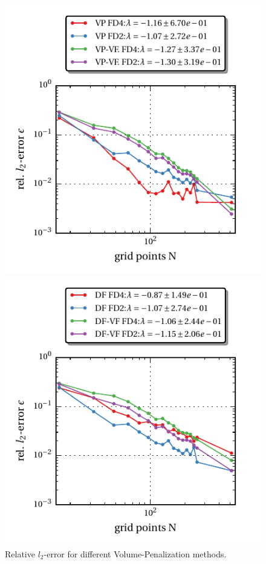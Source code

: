 \clearpage
\begin{figure}[!bp]
  \begin{minipage}[c]{0.5\textwidth}
      \includegraphics{gfx/immersed_boundary/tcflow/theo/vp.pdf}
      \caption{Relative $l_2$-error for different Volume-Penalization methods.}
      \label{vali:tc_flow_gc_vp}
  \end{minipage}
  \begin{minipage}[c]{0.5\textwidth}
      \includegraphics{gfx/immersed_boundary/tcflow/theo/df.pdf}

\end{minipage}
\end{figure}
